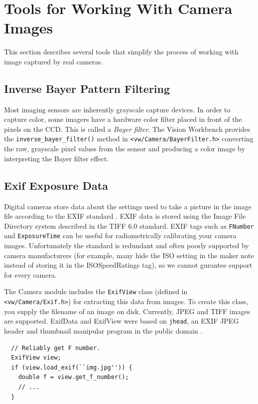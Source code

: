 \section{Tools for Working With Camera Images}

This section describes several tools that simplify the process of
working with image captured by real cameras.

\subsection{Inverse Bayer Pattern Filtering}

Most imaging sensors are inherently grayscale capture devices.  In
order to capture color, some imagers have a hardware color filter
placed in front of the pixels on the CCD.  This is called a {\em Bayer
  filter}.  The Vision Workbench provides the
\verb#inverse_bayer_filter()# method in
\verb#<vw/Camera/BayerFilter.h># converting the raw, grayscale pixel
values from the sensor and producing a color image by interpreting the
Bayer filter effect.

\subsection{Exif Exposure Data}

Digital cameras store data about the settings used to take a picture
in the image file according to the EXIF standard \cite{exif}. EXIF
data is stored using the Image File Directory system described in the
TIFF 6.0 standard.  EXIF tags such as {\tt FNumber} and
{\tt ExposureTime} can be useful for radiometrically calibrating your
camera images.  Unfortunately the standard is redundant and often
poorly supported by camera manufacturers (for example, many hide the
ISO setting in the maker note instead of storing it in the
ISOSpeedRatings tag), so we cannot gurantee support for every camera.

The Camera module includes the {\tt ExifView} class (defined in
\verb#<vw/Camera/Exif.h>#) for extracting this data from images.  To
create this class, you supply the filename of an image on disk.
Currently, JPEG and TIFF images are supported.  ExifData and ExifView
were based on {\tt jhead}, an EXIF JPEG header and thumbnail manipular
program in the public domain \cite{jhead}.

\begin{verbatim}
  // Reliably get F number. 
  ExifView view;
  if (view.load_exif(``img.jpg'')) {
    double f = view.get_f_number();
    // ...
  }
\end{verbatim}

